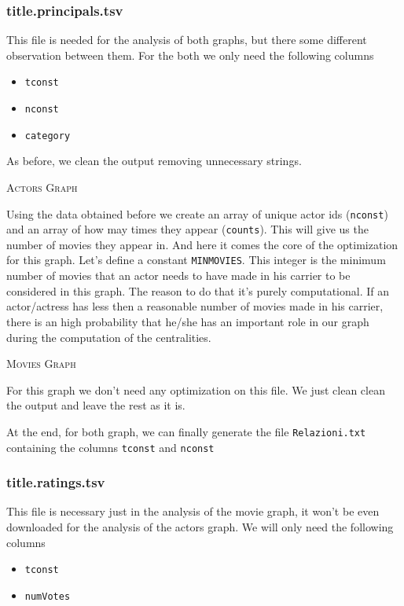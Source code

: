 \subsubsection{title.principals.tsv}

This file is needed for the analysis of both graphs, but there some different observation between them. For the both we only need the following columns

\begin{itemize}
    \item \texttt{tconst}
    \item \texttt{nconst}
    \item \texttt{category}
\end{itemize}

\noindent As before, we clean the output removing unnecessary strings. \s

\textsc{Actors Graph}
\s

\noindent Using the data obtained  before we create an array of unique actor ids (\texttt{nconst}) and an array of how may times they appear (\texttt{counts}). This will give us the number of movies they appear in. And here it comes the core of the optimization for this graph. Let's define a constant \texttt{MINMOVIES}. This integer is the minimum number of movies that an actor needs to have made in his carrier to be considered in this graph. The reason to do that it's purely computational. If an actor/actress has less then a reasonable number of movies made in his carrier, there is an high probability that he/she has an important role in our graph during the computation of the centralities. \s

\textsc{Movies Graph} \s

\noindent For this graph we don't need any optimization on this file. We just clean clean the output and leave the rest as it is. \s

\nd At the end, for both graph, we can finally generate the file \texttt{Relazioni.txt} containing the columns \texttt{tconst} and \texttt{nconst}

\subsubsection{title.ratings.tsv}

This file is necessary just in the analysis of the movie graph, it won't be even downloaded for the analysis of the actors graph. We will only need the following columns

\begin{itemize}
    \item \texttt{tconst}
    \item \texttt{numVotes}
\end{itemize}


